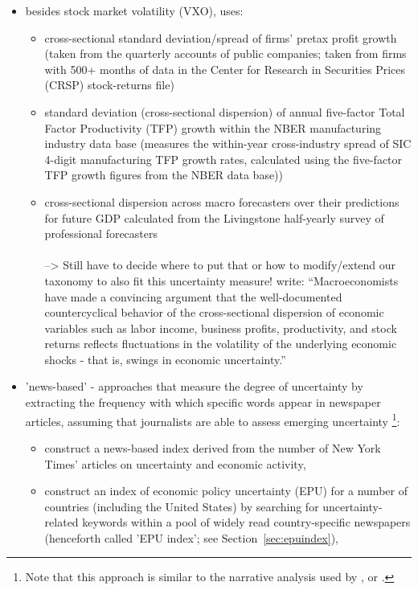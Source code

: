 \documentclass[a4paper,11pt,listof=nochaptergap,oneside,pointednumbers,bibtotoc,bigheadings,liststotoc]{scrbook}
\theoremstyle{mysatz}
\theoremstyle{mydefinition}
\theoremstyle{mybemerkung}
\begin{document}
\begin{itemize}
\begin{itemize}
\begin{itemize}
			\end{itemize}
			\item besides stock market volatility (VXO), \citet{bloom:09} uses: 
			\begin{itemize}
				\item cross-sectional standard deviation/spread of firms' pretax profit growth (taken from the quarterly accounts of public companies; taken from firms with 500+ months of data in the Center for Research in Securities Prices (CRSP) stock-returns file)
				\item standard deviation (cross-sectional dispersion) of annual five-factor Total Factor Productivity (TFP) growth within the NBER manufacturing industry data base (measures the within-year cross-industry spread of SIC 4-digit manufacturing TFP growth rates, calculated using the five-factor TFP growth figures from the NBER data base))
				\item cross-sectional dispersion across macro forecasters over their predictions for future GDP calculated from the Livingstone half-yearly survey of professional forecasters
				\\
				\\--> Still have to decide where to put that or how to modify/extend our taxonomy to also fit this uncertainty measure! \citet[p. 1]{gilchristetal:14} write: ``Macroeconomists have made a convincing argument that the well-documented countercyclical behavior of the cross-sectional dispersion of economic variables such as labor income, business profits, productivity, and stock returns reflects fluctuations in the volatility of the underlying economic shocks - that is, swings in economic uncertainty.''
			\end{itemize}
			\item 'news-based' - approaches that measure the degree of uncertainty by extracting the frequency with which specific words appear in newspaper articles, assuming that journalists are able to assess emerging uncertainty \footnote{Note that this approach is similar to the narrative analysis used by \citet{romerandromer:04}, \citet{romandrom:17} or \citet{ramey:09}.}: 
			\begin{itemize}
				\item \citet{alexopoulosandcohen:09} construct a news-based index derived from the number of New York Times' articles on uncertainty and economic activity,
				\item \citet{bakeretal:15} construct an index of economic policy uncertainty (EPU) for a number of countries (including the United States) by searching for uncertainty-related keywords within a pool of widely read country-specific newspapers (henceforth called 'EPU index'; see Section~\ref{sec:epuindex}),\\

\end{itemize}
\end{itemize}
\end{itemize}
\end{document}
